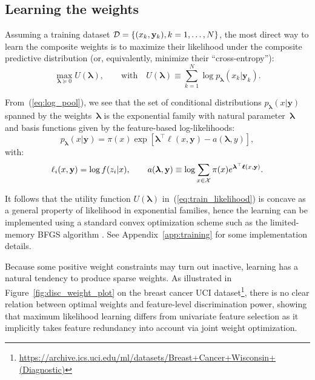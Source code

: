 \documentclass[english]{scrartcl}
\def\y{{\mathbf{y}}}
\newcommand{\blambda}{{\boldsymbol{\lambda}}}
\newcommand{\bell}{{\boldsymbol{\ell}}}
\begin{document}
\subsection{Learning the weights}
\label{sec:learning}

Assuming a training dataset ${\cal D}=\{(x_k,\y_k), k=1,\ldots,N\}$, the most direct way to learn the composite weights is to maximize their likelihood under the composite predictive distribution (or, equivalently, minimize their ``cross-entropy''):
\begin{equation}
\label{eq:train_likelihood}
\max_{\blambda\succeq 0} U(\blambda),
\qquad \text{with} \quad
U(\blambda) \equiv\sum_{k=1}^N \log p_\blambda(x_k|\y_k).
\end{equation}

From~(\ref{eq:log_pool}), we see that the set of conditional distributions $p_\blambda(x|\y)$ spanned by the weights~$\blambda$ is the exponential family with natural parameter~$\blambda$ and basis functions given by the feature-based log-likelihoods:
$$
p_\blambda(x|\y) = \pi(x) \exp[\blambda^\top \bell(x,\y) - a(\blambda,y)],
$$
with:
$$
\ell_i(x,\y) = \log f(z_i|x),
\qquad
a(\blambda, \y) \equiv \log \sum_{x\in{\cal X}} \pi(x) e^{\blambda^\top \bell(x,\y)}.
$$

It follows that the utility function $U(\blambda)$ in~(\ref{eq:train_likelihood}) is concave as a general property of likelihood in exponential families, hence the learning can be implemented using a standard convex optimization scheme such as the limited-memory BFGS algorithm \cite{Byrd-95}. See Appendix~\ref{app:training} for some implementation details. 

Because some positive weight constraints may turn out inactive, learning has a natural tendency to produce sparse weights. As illustrated in Figure~\ref{fig:disc_weight_plot} on the breast cancer UCI dataset\footnote{\url{https://archive.ics.uci.edu/ml/datasets/Breast+Cancer+Wisconsin+(Diagnostic)}}, there is no clear relation between optimal weights and feature-level discrimination power, showing that maximum likelihood learning differs from univariate feature selection as it implicitly takes feature redundancy into account via joint weight optimization.
\end{document}
